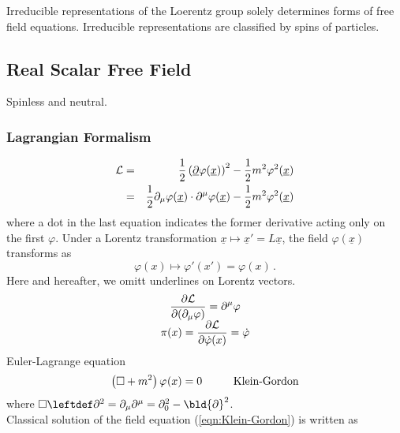 Irreducible representations of the Loerentz group solely 
determines forms of free field equations.
Irreducible representations are classified by
spins of particles.
\subsection{Real Scalar Free Field}
Spinless and neutral.
\subsubsection{Lagrangian Formalism}
\begin{eqnarray}
{\cal L} &=& \frac{1}{2} 
\left( \underline{\partial} \varphi(\underline{x}) \right)^2
-\frac{1}{2} m^2 \varphi^2(\underline{x})
\nonumber\\
&=& \frac{1}{2} 
\partial_\mu \varphi(\underline{x})\cdot \partial^\mu \varphi(\underline{x})
-\frac{1}{2} m^2 \varphi^2(\underline{x})
\label{eqn:RSCLagrangiandensity}
\end{eqnarray}
where a dot in the last equation indicates the former derivative acting only on the first $\varphi$.
Under a Lorentz transformation $\underline{x} \mapsto \underline{x}' = L\underline{x}$,
the field $\varphi(\underline{x})$ transforms as
\begin{equation}
\varphi(x) \mapsto \varphi'(x') = \varphi(x)\,.
\end{equation}
Here and hereafter, we omitt underlines on Lorentz vectors.
\begin{equation}
\begin{array}{c}
\displaystyle
\frac{\partial {\cal L}}{\partial(\partial_\mu \varphi)} = \partial^\mu \varphi
\\
\displaystyle
\pi(x) = \frac{ \partial {\cal L}}{ \partial \dot{\varphi}(x) } = \dot{\varphi}
\end{array}
\label{eqn:conjmomentumRscalar}
\end{equation}
Euler-Lagrange equation
\begin{equation}
\left( \Box + m^2 \right) \varphi_{}(x) = 0
\hspace{10mm}
\mbox{Klein-Gordon}
\label{eqn:Klein-Gordon}
\end{equation}
where $\Box \leftdef \partial^2 = \partial_\mu \partial^\mu = \partial_0^2 - \bld{\partial}^2$.\\
Classical solution of the field equation (\ref{eqn:Klein-Gordon}) is written as
